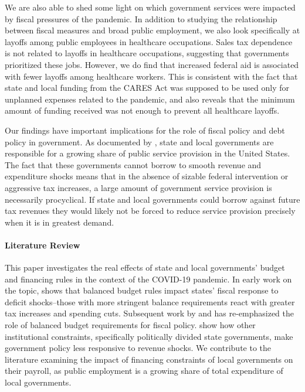 We are also able to shed some light on which government services were impacted by fiscal pressures of the pandemic. In addition to studying the relationship between fiscal measures and broad public employment, we also look specifically at layoffs among public employees in healthcare occupations. Sales tax dependence is not related to layoffs in healthcare occupations, suggesting that governments prioritized these jobs. However, we do find that increased federal aid is associated with fewer layoffs among healthcare workers. This is consistent with the fact that state and local funding from the CARES Act was supposed to be used only for unplanned expenses related to the pandemic, and also reveals that the minimum amount of funding received was not enough to prevent all healthcare layoffs.

Our findings have important implications for the role of fiscal policy and debt policy in government. 
As documented by  \cite{Baicker_al:2012:RiseStates}, state and local governments are responsible for a growing share of public service provision in the United States. 
The fact that these governments cannot borrow to smooth revenue and expenditure shocks means that in the absence of sizable federal intervention or aggressive tax increases, a large amount of government service provision is necessarily procyclical. 
If state and local governments could borrow against future tax revenues they would likely not be forced to reduce service provision precisely when it is in greatest demand.


\paragraph{Literature Review}

This paper investigates the real effects of state and local governments' budget and financing rules in the context of the COVID-19 pandemic.
In early work on the topic, \cite{Poterba:1994:FiscalCrises,Poterba:1995:BudgetRules,Poterba:1995:CapitalBudgets} shows that balanced budget rules impact states' fiscal response to deficit shocks--those with more stringent balance requirements react with greater tax increases and spending cuts.
Subsequent work by \cite{Fatas_Mihov:2006:FiscalRules} and \cite{HouSmith:2010:BBR} has re-emphasized the role of balanced budget requirements for fiscal policy.
\cite{Alt_Lowry:1994:DividedGov} show how other institutional constraints, specifically politically divided state governments, make government policy less responsive to revenue shocks.
We contribute to the literature examining the impact of financing constraints of local governments on their payroll, as public employment is a growing share of total expenditure of local governments. 

